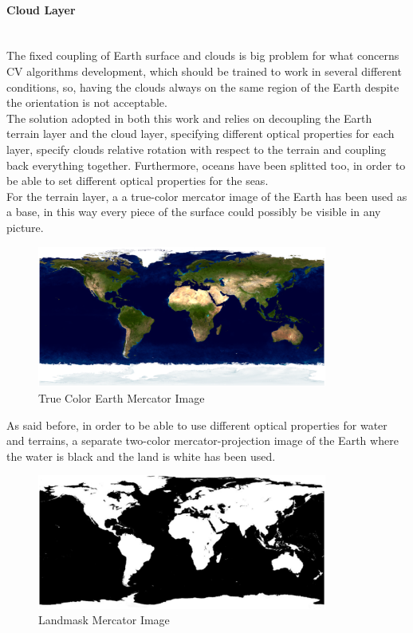 \paragraph{Cloud Layer}\mbox{}\\
The fixed coupling of Earth surface and clouds is big problem for what concerns CV algorithms development, which should be trained to work in several different conditions, so, having the clouds always on the same region of the Earth despite the orientation is not acceptable.\\
The solution adopted in both this work and \cite{jacopo} relies on decoupling the Earth terrain layer and the cloud layer, specifying different optical properties for each layer, specify clouds relative rotation with respect to the terrain and coupling back everything together. 
Furthermore, oceans have been splitted too, in order to be able to set different optical properties for the seas.\\
For the terrain layer, a a true-color mercator image of the Earth has been used as a base, in this way every piece of the surface could possibly be visible in any picture.

\begin{figure}[H]
\centering
\includegraphics[width=0.85\textwidth]{gfx/earthMercator.eps}
\caption{True Color Earth Mercator Image \cite{bluemarble}}
\label{fig:EarthMercator}
\end{figure}

\bigskip

As said before, in order to be able to use different optical properties for water and terrains, a separate two-color mercator-projection image of the Earth where the water is black and the land is white has been used.

\begin{figure}[H]
\centering
\includegraphics[width=0.85\textwidth]{gfx/landmask_mercator.eps}
\caption{Landmask Mercator Image}
\label{fig:LandmaskMercator}
\end{figure}

